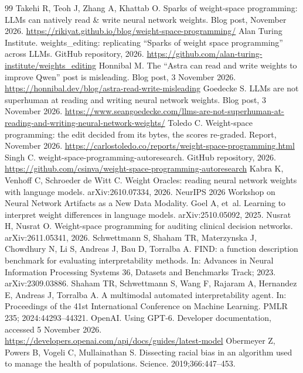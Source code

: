 \documentclass[11pt]{article}
\begin{document}
\begin{thebibliography}{99}\small
{} Takehi R, Teoh J, Zhang A, Khattab O. Sparks of weight-space programming: LLMs can natively read \& write neural network weights. Blog post, November 2026. \url{https://rikiyat.github.io/blog/weight-space-programming/}
 Alan Turing Institute. weights\_editing: replicating ``Sparks of weight space programming'' across LLMs. GitHub repository, 2026. \url{https://github.com/alan-turing-institute/weights_editing}
 Honnibal M. The ``Astra can read and write weights to improve Qwen'' post is misleading. Blog post, 3 November 2026. \url{https://honnibal.dev/blog/astra-read-write-misleading}
 Goedecke S. LLMs are not superhuman at reading and writing neural network weights. Blog post, 3 November 2026. \url{https://www.seangoedecke.com/llms-are-not-superhuman-at-reading-and-writing-neural-network-weights/}
 Toledo C. Weight-space programming: the edit decided from its bytes, the scores re-graded. Report, November 2026. \url{https://carlostoledo.co/reports/weight-space-programming.html}
 Singh C. weight-space-programming-autoresearch. GitHub repository, 2026. \url{https://github.com/csinva/weight-space-programming-autoresearch}
 Kabra K, Venhoff C, Schroeder de Witt C. Weight Oracles: reading neural network weights with language models. arXiv:2610.07334, 2026. NeurIPS 2026 Workshop on Neural Network Artifacts as a New Data Modality.
 Goel A, et~al. Learning to interpret weight differences in language models. arXiv:2510.05092, 2025.
 Nusrat H, Nusrat O. Weight-space programming for auditing clinical decision networks. arXiv:2611.05341, 2026.
 Schwettmann S, Shaham TR, Materzynska J, Chowdhury N, Li S, Andreas J, Bau D, Torralba A. FIND: a function description benchmark for evaluating interpretability methods. In: Advances in Neural Information Processing Systems 36, Datasets and Benchmarks Track; 2023. arXiv:2309.03886.
 Shaham TR, Schwettmann S, Wang F, Rajaram A, Hernandez E, Andreas J, Torralba A. A multimodal automated interpretability agent. In: Proceedings of the 41st International Conference on Machine Learning. PMLR 235; 2024:44293--44321.
 OpenAI. Using GPT-6. Developer documentation, accessed 5 November 2026. \url{https://developers.openai.com/api/docs/guides/latest-model}
 Obermeyer Z, Powers B, Vogeli C, Mullainathan S. Dissecting racial bias in an algorithm used to manage the health of populations. Science. 2019;366:447--453.

\end{thebibliography}
\end{document}
